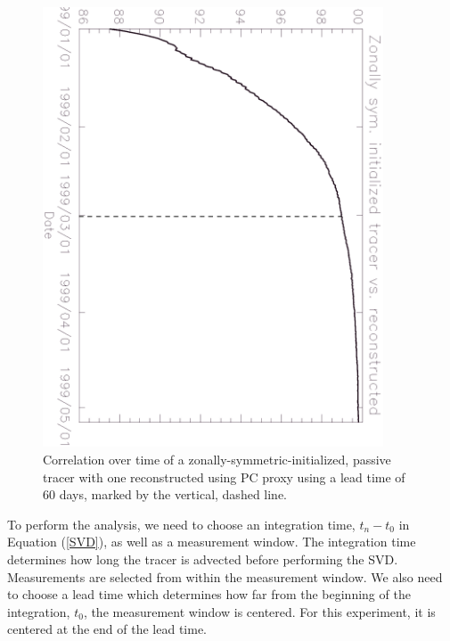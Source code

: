 \documentclass{article}
\begin{document}
\begin{figure}
\begin{center}
\includegraphics[angle=90, width=0.9\textwidth]{../pc_proxy/proxycorr.eps}
\caption{Correlation over time of a zonally-symmetric-initialized, passive tracer
with one reconstructed using PC proxy using a lead time of 60 days,
marked by the vertical, dashed line.}\label{PCproxytest}
\end{center}
\end{figure}

To perform the analysis, we need to choose an integration time, 
$t_n-t_0$ in Equation (\ref{SVD}), as well as a measurement window.
The integration time determines how long the tracer is advected before performing
the SVD.
Measurements are selected from within the measurement window.
We also need to choose a lead time which determines how far from the
beginning of the integration, $t_0$, the measurement window is centered.
For this experiment, it is centered at the end of the lead time.
\end{document}
